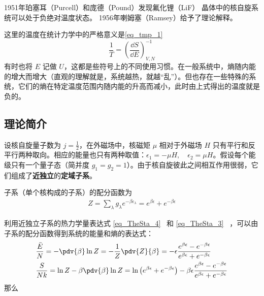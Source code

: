 
\begin{issues}
\issueDraft
\end{issues}

1951年珀塞耳（Purcell）和庞德（Pound）发现氟化锂（LiF） 晶体中的核自旋系统可以处于负绝对温度状态。
1956年喇姆塞（Ramsey）给予了理论解释。\cite{热统}

这里的温度在统计力学中的严格意义是\autoref{eq_tmp_1}~
\begin{equation}
\frac{1}{T}=\left(\frac{\dd S}{\dd E}\right)_{V,N}^{-1}
\end{equation}
有时也将 $E$ 记做 $U$，这都是些符号上的不同使用习惯。在一般系统中，熵随内能的增大而增大（直观的理解就是，系统越热，就越“乱”）。但也存在一些特殊的系统，它们的熵在特定温度范围内随内能的升高而减小，此时由上式得出的温度就是负的。

\subsection{理论简介}
设核自旋量子数为 $j=\frac{1}{2}$，在外磁场中，核磁矩 $\mu$ 相对于外磁场 $H$ 只有平行和反平行两种取向。相应的能量也只有两种取值：$\epsilon_1=-\mu H,\quad \epsilon_2=\mu H$。假设每个能级只有一个量子态（简并度 $g_1=g_2=1$）。由于核自旋彼此之间相互作用很弱，它们组成了\textbf{近独立}的\textbf{定域子系}。

子系（单个核构成的子系）的配分函数为
\begin{equation}
\begin{aligned}
Z=\sum_{\lambda}g_\lambda e^{-\beta \epsilon_\lambda}=e^{\beta \epsilon } +e^{-\beta \epsilon}
\end{aligned}
\end{equation}

利用近独立子系的热力学量表达式 \autoref{eq_TheSta_4}~ 和 \autoref{eq_TheSta_3}~ ，可以由子系的配分函数得到系统的能量和熵的表达式：
\begin{equation}
\begin{aligned}
&\frac{\bar E}{N}=-\pdv{\beta} \ln Z=-\frac{1}{Z}\pdv{Z}{\beta}
=-\epsilon\frac{e^{\beta\epsilon}-e^{-\beta\epsilon}}{e^{\beta\epsilon}+e^{-\beta\epsilon}}\\
&\frac{S}{Nk}
=\ln Z-\beta\pdv{\beta} \ln Z=
\ln \left(e^{\beta\epsilon}+e^{-\beta\epsilon}\right)-
\beta\epsilon \frac{e^{\beta\epsilon}-e^{-\beta\epsilon}}{e^{\beta\epsilon}+e^{-\beta\epsilon}}
\end{aligned}
\end{equation}
那么